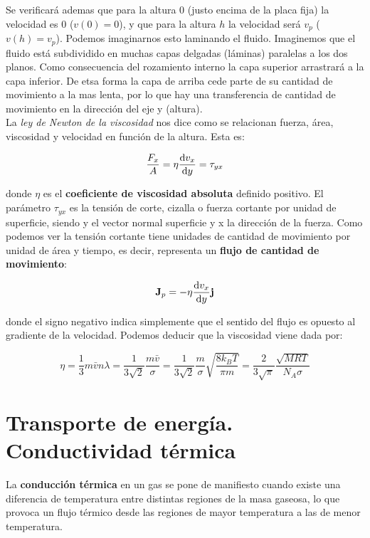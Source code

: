 \documentclass[12pt,a4paper,oneside]{book}
\begin{document}
Se verificará ademas que para la altura 0 (justo encima de la placa fija) la velocidad es 0 ($v(0)=0$), y que para la altura $h$ la velocidad será $v_p$ ($v(h)=v_p$). Podemos imaginarnos esto laminando el fluido. Imaginemos que el fluido está subdividido en muchas capas delgadas (láminas) paralelas a los dos planos. Como consecuencia del rozamiento interno la capa superior arrastrará a la capa inferior. De etsa forma la capa de arriba cede parte de su cantidad de movimiento a la mas lenta, por lo que hay una transferencia de cantidad de movimiento en la dirección del eje y (altura). \\

La \textit{ley de Newton de la viscosidad} nos dice como se relacionan fuerza, área, viscosidad y velocidad en función de la altura. Esta es:

\begin{equation}
\dfrac{F_x}{A} = \eta \dfrac{\mathrm{d} v_x}{\mathrm{d} y} = \tau_{yx}
\end{equation}

donde $\eta$ es el \textbf{coeficiente de viscosidad absoluta} definido positivo. El parámetro $\tau_{yx}$ es la tensión de corte, cizalla o fuerza cortante por unidad de superficie, siendo y el vector normal superficie y x la dirección de la fuerza. Como podemos ver la tensión cortante tiene unidades de cantidad de movimiento por unidad de área y tiempo, es decir, representa un  \textbf{flujo de cantidad de movimiento}:

\begin{equation}
\textbf{J}_p = - \eta \dfrac{\mathrm{d} v_x}{\mathrm{d} y} \mathbf{j}
\end{equation}

donde el signo negativo indica simplemente que el sentido del flujo es opuesto al gradiente de la velocidad. Podemos deducir que la viscosidad viene dada por:

\begin{equation}
\eta = \dfrac{1}{3} m \bar{v} n \lambda = \dfrac{1}{3 \sqrt{2}} \dfrac{m \bar{v}}{\sigma} = \dfrac{1}{3 \sqrt{2}} \dfrac{m}{\sigma} \sqrt{\dfrac{8 k_B T}{\pi m}} = \dfrac{2}{3 \sqrt{\pi}} \dfrac{\sqrt{MRT}}{N_A \sigma}
\end{equation}

\section{Transporte de energía. Conductividad térmica}

La \textbf{conducción térmica} en un gas se pone de manifiesto cuando existe una diferencia de temperatura entre distintas regiones de la masa gaseosa, lo que provoca un flujo térmico desde las regiones de mayor temperatura a las de menor temperatura. \\
\end{document}
